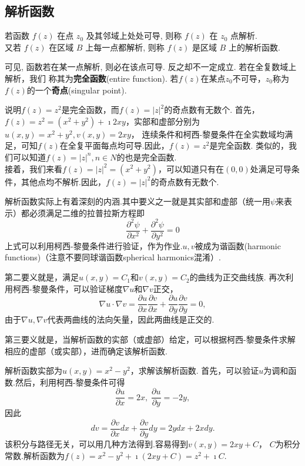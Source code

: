 \subsection{解析函数}
\begin{Definition}
若函数 $f(z)$ 在点 $z_0$ 及其邻域上处处可导, 则称 $f(z)$ 在 $z_0$ 点解析.\\
 又若 $f(z)$ 在区域 $B$ 上每一点都解析, 则称 $f(z)$ 是区域 $B$ 上的解析函数.
\end{Definition} 
 可见, 函数若在某一点解析, 则必在该点可导. 反之却不一定成立. 若在全复数域上解析，我们
 称其为{\bf 完全函数}(entire function).
 若$f(z)$在某点$z_0$不可导，$z_0$称为$f(z)$的一个{\bf 奇点}(singular point).

 \begin{examplebox}{说明$f(z)=z^2$是完全函数，而$f(z)=|z|^2$的奇点数有无数个.}
    首先，$f(z) =z^2 = (x^2 + y ^2) + \imath 2 x y$，实部和虚部分别为$u(x,y) = x^2+ y^2, v(x,y)=2x y$，
连续条件和柯西-黎曼条件在全实数域均满足，可知$f(z)$在全复平面每点均可导.因此，$f(z)=z^2$是完全函数.
类似的，我们可以知道$f(z)=|z|^n, n\in N$的也是完全函数.\\
    接着，我们来看$f(z) = |z|^2 = (x^2 + y ^2)$，可以知道只有在$(0,0)$处满足可导条件，其他点均不解析.因此，$f(z)=|z|^2$的奇点数有无数个.
 \end{examplebox}

 解析函数实际上有着深刻的内涵.其中要义之一就是其实部和虚部（统一用$\psi$来表示）都必须满足二维的拉普拉斯方程即
 \begin{equation}
    \label{eq:Laplace_eq}
    \frac{\partial^2 \psi}{\partial x^2}+\frac{\partial^2 \psi}{\partial y^2}=0
 \end{equation}
上式可以利用柯西-黎曼条件进行验证，作为作业.$u,v$被成为谐函数(harmonic functions)（注意不要同球谐函数spherical harmonics混淆）.

第二要义就是，满足$u(x,y) = C_1$和$v(x,y)= C_2$的曲线为正交曲线族.
再次利用柯西-黎曼条件，可以验证梯度$\nabla u $和$\nabla v$正交，
\begin{equation}
    \nabla u \cdot \nabla v = \frac{\partial u}{\partial x} 
    \frac{\partial v}{\partial x}+\frac{\partial u}{\partial y} \frac{\partial v}{\partial y}=0 ,
\end{equation}
由于$\nabla u, \nabla v$代表两曲线的法向矢量，因此两曲线是正交的.

第三要义就是，当解析函数的实部（或虚部）给定，可以根据柯西-黎曼条件求解相应的虚部（或实部），进而确定该解析函数.

\begin{examplebox}{解析函数实部为$u(x,y) = x^2 - y^2$，求解该解析函数.}
首先，可以验证$u$为调和函数.然后，利用柯西-黎曼条件可得
\begin{equation}
    \frac{\partial u}{\partial x } = 2x, \; \frac{\partial u}{\partial y } = -2y  ,
\end{equation}
因此
\begin{equation}
    d v = \frac{\partial v}{\partial x } dx + \frac{\partial v}{\partial y } dy = 2y dx + 2x dy .
\end{equation}
该积分与路径无关，可以用几种方法得到.容易得到$v(x,y) = 2xy + C$， $C$为积分常数.解析函数为$f(z)=x^2 - y^2 + \imath (2x y + C) = z^2 + \imath C$.
\end{examplebox}
    
